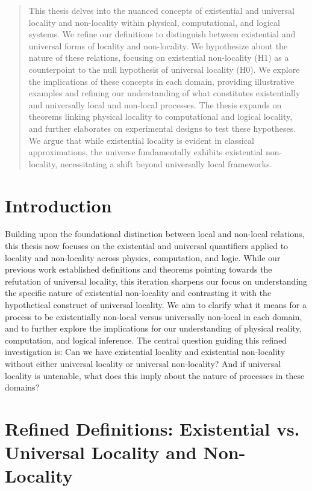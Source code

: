 	
	\begin{abstract}
		This thesis delves into the nuanced concepts of existential and universal locality and non-locality within physical, computational, and logical systems. We refine our definitions to distinguish between existential and universal forms of locality and non-locality. We hypothesize about the nature of these relations, focusing on existential non-locality (H1) as a counterpoint to the null hypothesis of universal locality (H0). We explore the implications of these concepts in each domain, providing illustrative examples and refining our understanding of what constitutes existentially and universally local and non-local processes.  The thesis expands on theorems linking physical locality to computational and logical locality, and further elaborates on experimental designs to test these hypotheses. We argue that while existential locality is evident in classical approximations, the universe fundamentally exhibits existential non-locality, necessitating a shift beyond universally local frameworks.
	\end{abstract}
	
	\section{Introduction}
	
	Building upon the foundational distinction between local and non-local relations, this thesis now focuses on the existential and universal quantifiers applied to locality and non-locality across physics, computation, and logic.  While our previous work established definitions and theorems pointing towards the refutation of universal locality, this iteration sharpens our focus on understanding the specific nature of existential non-locality and contrasting it with the hypothetical construct of universal locality.  We aim to clarify what it means for a process to be existentially non-local versus universally non-local in each domain, and to further explore the implications for our understanding of physical reality, computation, and logical inference.  The central question guiding this refined investigation is: Can we have existential locality and existential non-locality without either universal locality or universal non-locality?  And if universal locality is untenable, what does this imply about the nature of processes in these domains?

	\section{Refined Definitions: Existential vs. Universal Locality and Non-Locality}

